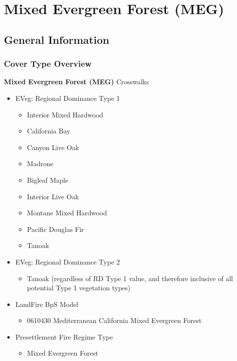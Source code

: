 \newpage
\section{Mixed Evergreen Forest (MEG)}
\label{meg-description}

\subsection*{General Information}

\subsubsection{Cover Type Overview}

\textbf{Mixed Evergreen Forest (MEG)}
\newline
Crosswalks
\begin{itemize}
	\item EVeg: Regional Dominance Type 1
	\begin{itemize}
		\item Interior Mixed Hardwood
		\item California Bay
		\item Canyon Live Oak
		\item Madrone
		\item Bigleaf Maple
		\item Interior Live Oak
		\item Montane Mixed Hardwood 
		\item Pacific Douglas Fir
		\item Tanoak
	\end{itemize}

	\item EVeg: Regional Dominance Type 2
	\begin{itemize}
		\item Tanoak (regardless of RD Type 1 value, and therefore inclusive of all potential Type 1 vegetation types)
	\end{itemize}

	\item LandFire BpS Model
	\begin{itemize}
		\item 0610430 Mediterranean California Mixed Evergreen Forest
	\end{itemize}

	\item Presettlement Fire Regime Type
	\begin{itemize}
		\item Mixed Evergreen Forest
	\end{itemize}
\end{itemize}

